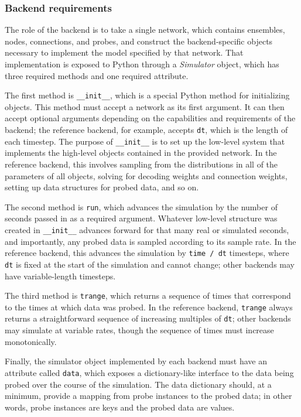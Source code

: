 \documentclass{frontiersSCNS}
\begin{document}
\subsubsection{Backend requirements}
\label{Sec:Backend}

The role of the backend is to take
a single network, which contains
ensembles, nodes, connections, and probes,
and construct the backend-specific objects necessary
to implement the model specified by that network.
That implementation is exposed to Python
through a \textit{Simulator} object,
which has three required methods
and one required attribute.

The first method is \texttt{\_\_init\_\_},
which is a special Python method for initializing objects.
This method must accept a network as its first argument.
It can then accept optional arguments depending on
the capabilities and requirements of the backend;
the reference backend, for example,
accepts \texttt{dt},
which is the length of each timestep.
The purpose of \texttt{\_\_init\_\_} is to
set up the low-level system
that implements the high-level objects
contained in the provided network.
In the reference backend,
this involves sampling from the distributions
in all of the parameters of all objects,
solving for decoding weights and connection weights,
setting up data structures for probed data,
and so on.

The second method is \texttt{run},
which advances the simulation
by the number of seconds
passed in as a required argument.
Whatever low-level structure was created
in \texttt{\_\_init\_\_} advances forward
for that many real or simulated seconds,
and importantly, any probed data is sampled
according to its sample rate.
In the reference backend,
this advances the simulation
by \texttt{time / dt} timesteps,
where \texttt{dt} is fixed at the start of the simulation
and cannot change;
other backends may have variable-length timesteps.

The third method is \texttt{trange},
which returns a sequence of times that correspond
to the times at which data was probed.
In the reference backend, \texttt{trange} always returns
a straightforward sequence of increasing
multiples of \texttt{dt};
other backends may simulate at variable rates,
though the sequence of times must increase monotonically.

Finally, the simulator object implemented by each backend
must have an attribute called \texttt{data},
which exposes a dictionary-like interface
to the data being probed over the course
of the simulation.
The data dictionary should,
at a minimum, provide a mapping from
probe instances to the probed data;
in other words, probe instances are keys
and the probed data are values.
\end{document}
